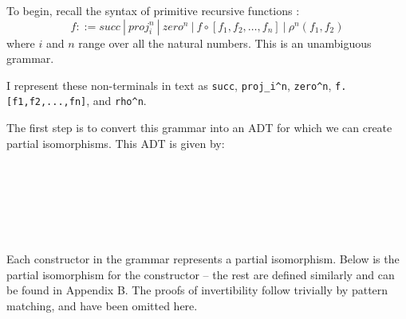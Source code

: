 \documentclass[12pt,a4paper,twoside,openright]{report}
\newcommand{\F}{\AgdaFunction}
\begin{document}
{To begin, recall the syntax of primitive recursive functions \cite{computability}\cite{boolos}:
$$f ::= succ\  |\  proj_i^n\ |\ zero^n\ |\ f \circ [f_1,f_2,\hdots,f_n]\ |\ \rho^n(f_1,f_2)$$
where $i$ and $n$ range over all the natural numbers. This is an unambiguous grammar.

I represent these non-terminals in text as {\tt succ}, {\tt proj\_i\^{}n}, {\tt zero\^{}n}, {\tt f.[f1,f2,...,fn]}, and {\tt rho\^{}n}.

The first step is to convert this grammar into an ADT for which we can create partial isomorphisms. This ADT is given by:

\begin{code}
\>  \AgdaSymbol{:}  \<%
\\
\>[0]\<[2]%
\>[2] \AgdaSymbol{:} \<%
\\
\>[0]\<[2]%
\>[2] \AgdaSymbol{:}     \<%
\\
\>[0]\<[2]%
\>[2] \AgdaSymbol{:}   \<%
\\
\>[0]\<[2]%
\>[2] \AgdaSymbol{:}       \<%
\\
\>[0]\<[2]%
\>[2] \AgdaSymbol{:}      \<%
\end{code}

Each constructor in the grammar represents a partial isomorphism. Below is the partial isomorphism for the \F{Comp} constructor -- the rest are defined similarly and can be found in Appendix B. The proofs of invertibility follow trivially by pattern matching, and have been omitted here.

}
\end{document}
